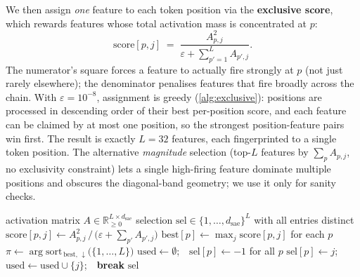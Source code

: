 We then assign \emph{one} feature to each token position via the \textbf{exclusive score}, which rewards features whose total activation mass is concentrated at $p$:
\begin{equation}
    \mathrm{score}[p, j] \;=\; \frac{A_{p, j}^2}{\varepsilon + \sum_{p'=1}^{L} A_{p', j}}.
    \label{eq:exclusive-score}
\end{equation}
The numerator's square forces a feature to actually fire strongly at $p$ (not just rarely elsewhere); the denominator penalises features that fire broadly across the chain. With $\varepsilon=10^{-8}$, assignment is greedy (\cref{alg:exclusive}): positions are processed in descending order of their best per-position score, and each feature can be claimed by at most one position, so the strongest position-feature pairs win first. The result is exactly $L{=}32$ features, each fingerprinted to a single token position. The alternative \emph{magnitude} selection (top-$L$ features by $\sum_p A_{p,j}$, no exclusivity constraint) lets a single high-firing feature dominate multiple positions and obscures the diagonal-band geometry; we use it only for sanity checks.

\begin{algorithm}[h]
\caption{\textsc{ExclusiveSelect}: per-position feature assignment.}
\label{alg:exclusive}
\small
\begin{algorithmic}[1]
\Require activation matrix $A\in\mathbb{R}_{\geq 0}^{L\times d_{\text{sae}}}$
\Ensure  selection $\mathrm{sel}\in\{1,\ldots,d_{\text{sae}}\}^L$ with all entries distinct
\State $\mathrm{score}[p,j] \gets A_{p,j}^2 \,\big/\, \bigl(\varepsilon + \sum_{p'} A_{p',j}\bigr)$
\State $\mathrm{best}[p] \gets \max_j \mathrm{score}[p, j]$ for each $p$
\State $\pi \gets \arg\!\mathrm{sort}_{\,\mathrm{best},\,\downarrow}\bigl(\{1,\ldots,L\}\bigr)$
\State $\mathrm{used} \gets \emptyset$;\ \ $\mathrm{sel}[p] \gets -1$ for all $p$
            $\mathrm{sel}[p] \gets j$;\ \ $\mathrm{used} \gets \mathrm{used} \cup \{j\}$;\ \ \textbf{break}
        \EndIf
    \EndFor
\EndFor
\State \Return $\mathrm{sel}$
\end{algorithmic}
\end{algorithm}
